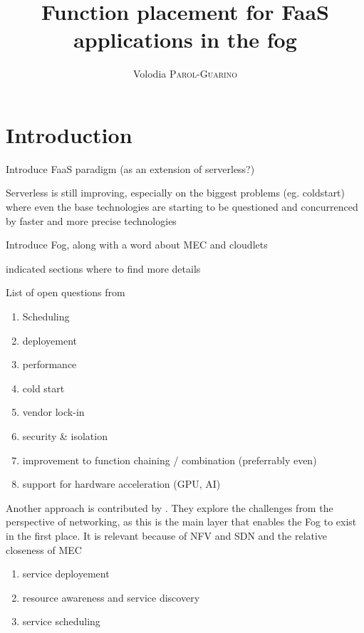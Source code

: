 \documentclass[11pt]{sdm}
\title{Function placement for FaaS applications in the fog}
\author{Volodia \textsc{Parol-Guarino}}
\begin{document}
\maketitle


\section{Introduction}
\begin{itemize}
	\item Introduce \gls{FaaS} paradigm (as an extension of serverless?)
	\item Serverless is still improving, especially on the biggest problems (eg. coldstart) where even the base technologies are starting to be questioned and concurrenced by faster and more precise technologies \citet{hykes_solomon_2019}
	\item Introduce Fog, along with a word about \gls{MEC} and cloudlets
	\item indicated sections where to find more details
	\item {List of open questions from \citet{kjorveziroski_iot_2021}
	      \begin{enumerate}
		      \item Scheduling
		      \item deployement
		      \item performance
		      \item cold start
		      \item vendor lock-in
		      \item security \& isolation
		      \item improvement to function chaining / combination (preferrably even)
		      \item support for hardware acceleration (GPU, AI)
	      \end{enumerate}
	\item { Another approach is contributed by \citet{xie_when_2021}. They explore the challenges from the perspective of networking, as this is the main layer that enables the Fog to exist in the first place. It is relevant because of \gls{NFV} and \gls{SDN} and the relative closeness of \gls{MEC}
	      \begin{enumerate}
		      \item service deployement
		      \item resource awareness and service discovery
		      \item service scheduling

\end{enumerate}}}
\end{itemize}
\end{document}
